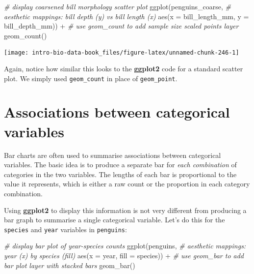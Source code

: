 \documentclass[
]{book}
\newenvironment{Shaded}{\begin{snugshade}}{\end{snugshade}}
\newcommand{\AttributeTok}[1]{\textcolor[rgb]{0.77,0.63,0.00}{#1}}
\newcommand{\CommentTok}[1]{\textcolor[rgb]{0.56,0.35,0.01}{\textit{#1}}}
\newcommand{\FunctionTok}[1]{\textcolor[rgb]{0.00,0.00,0.00}{#1}}
\newcommand{\NormalTok}[1]{#1}
\newcommand{\SpecialCharTok}[1]{\textcolor[rgb]{0.00,0.00,0.00}{#1}}
\begin{document}
\begin{Shaded}
\begin{Highlighting}[]
\CommentTok{\# display coarsened bill morphology scatter plot}
\FunctionTok{ggplot}\NormalTok{(penguins\_coarse,}
       \CommentTok{\# aesthetic mappings: bill depth (y) vs bill length (x)}
       \FunctionTok{aes}\NormalTok{(}\AttributeTok{x =}\NormalTok{ bill\_length\_mm, }\AttributeTok{y =}\NormalTok{ bill\_depth\_mm)) }\SpecialCharTok{+} 
  \CommentTok{\# use geom\_count to add sample size scaled points layer}
  \FunctionTok{geom\_count}\NormalTok{()}
\end{Highlighting}
\end{Shaded}

\begin{center}\texttt{[image: intro-bio-data-book\_files/figure-latex/unnamed-chunk-246-1]} \end{center}

Again, notice how similar this looks to the \textbf{ggplot2} code for a standard scatter plot. We simply used \texttt{geom\_count} in place of \texttt{geom\_point}.

\hypertarget{categorical-association}{%
\section{Associations between categorical variables}\label{categorical-association}}

Bar charts are often used to summarise associations between categorical variables. The basic idea is to produce a separate bar for \emph{each combination} of categories in the two variables. The lengths of each bar is proportional to the value it represents, which is either a raw count or the proportion in each category combination.

Using \textbf{ggplot2} to display this information is not very different from producing a bar graph to summarise a single categorical variable. Let's do this for the \texttt{species} and \texttt{year} variables in \texttt{penguins}:

\begin{Shaded}
\begin{Highlighting}[]
\CommentTok{\# display bar plot of year{-}species counts}
\FunctionTok{ggplot}\NormalTok{(penguins, }
       \CommentTok{\# aesthetic mappings: year (x) by species (fill)}
       \FunctionTok{aes}\NormalTok{(}\AttributeTok{x =}\NormalTok{ year, }\AttributeTok{fill =}\NormalTok{ species)) }\SpecialCharTok{+}
  \CommentTok{\# use geom\_bar to add bar plot layer  with stacked bars}
  \FunctionTok{geom\_bar}\NormalTok{()}
\end{Highlighting}
\end{Shaded}
\end{document}
